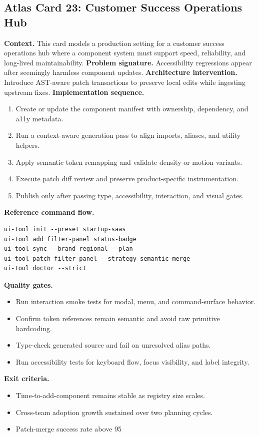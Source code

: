 \subsection*{Atlas Card 23: Customer Success Operations Hub}
\textbf{Context.} This card models a production setting for a customer success operations hub where a component system must support speed, reliability, and long-lived maintainability.
\textbf{Problem signature.} Accessibility regressions appear after seemingly harmless component updates.
\textbf{Architecture intervention.} Introduce AST-aware patch transactions to preserve local edits while ingesting upstream fixes.
\textbf{Implementation sequence.}
\begin{enumerate}[leftmargin=*, itemsep=0.28em]
  \item Create or update the component manifest with ownership, dependency, and a11y metadata.
  \item Run a context-aware generation pass to align imports, aliases, and utility helpers.
  \item Apply semantic token remapping and validate density or motion variants.
  \item Execute patch diff review and preserve product-specific instrumentation.
  \item Publish only after passing type, accessibility, interaction, and visual gates.
\end{enumerate}
\textbf{Reference command flow.}
\begin{verbatim}
ui-tool init --preset startup-saas
ui-tool add filter-panel status-badge
ui-tool sync --brand regional --plan
ui-tool patch filter-panel --strategy semantic-merge
ui-tool doctor --strict
\end{verbatim}
\textbf{Quality gates.}
\begin{itemize}[leftmargin=*, itemsep=0.24em]
  \item Run interaction smoke tests for modal, menu, and command-surface behavior.
  \item Confirm token references remain semantic and avoid raw primitive hardcoding.
  \item Type-check generated source and fail on unresolved alias paths.
  \item Run accessibility tests for keyboard flow, focus visibility, and label integrity.
\end{itemize}
\textbf{Exit criteria.}
\begin{itemize}[leftmargin=*, itemsep=0.24em]
  \item Time-to-add-component remains stable as registry size scales.
  \item Cross-team adoption growth sustained over two planning cycles.
  \item Patch-merge success rate above 95%
\end{itemize}
\clearpage
